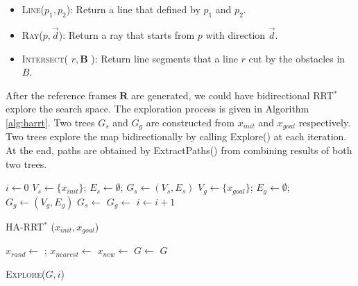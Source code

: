 \documentclass[letterpaper, 10 pt, conference]{ieeeconf}
\begin{document}
\begin{itemize}
	\item \textsc{Line}($ p_{1}, p_{2} $):
	Return a line that defined by $ p_{1} $ and $ p_{2} $.
	\item \textsc{Ray}($ p, \vec{d} $):
	Return a ray that starts from $ p $ with direction $ \vec{d}  $.
	\item \textsc{Intersect}( $ r , \bm{B} $ ):
	Return line segments that a line $ r $ cut by the obstacles in $ B $.
\end{itemize}

After the reference frames $ \mathbf{R} $ are generated, we could have bidirectional RRT$^{*}$ explore the search space.
The exploration process is given in Algorithm \ref{alg:harrt}.
Two trees $ G_{s} $ and $ G_{g} $ are constructed from $ x_{init} $ and $ x_{goal} $ respectively.
Two trees explore the map bidirectionally by calling {\sc Explore}() at each iteration.
At the end, paths are obtained by {\sc ExtractPaths}() from combining results of both two trees.

\begin{algorithm}
	\begin{algorithmic}[1]
		\State $ i \leftarrow 0 $
		\State $ V_{s} \leftarrow \{ x_{init} \} $; $ E_{s} \leftarrow \emptyset $; $ G_{s} \leftarrow (V_{s}, E_{s}) $
		\State $ V_{g} \leftarrow \{ x_{goal} \} $; $ E_{g} \leftarrow \emptyset $; $ G_{g} \leftarrow (V_{g}, E_{g}) $
			\State $ G_{s} \leftarrow $ 
			\State $ G_{g} \leftarrow $ 
			\State $ i \leftarrow i + 1 $
		\EndWhile
		\State {}
	\end{algorithmic}
	\caption{HA-RRT$^{*}$ ($ x_{init} , x_{goal}  $) }
	\label{alg:harrt}
\end{algorithm}

\begin{algorithm}
	\begin{algorithmic}[1]
		\State $ x_{rand} \leftarrow $  ;
		\State $ x_{nearest} \leftarrow $ 
		\State $ x_{new} \leftarrow $ 
			\State $ G \leftarrow $ 
		\EndIf
		\Return $ G $
	\end{algorithmic}
	\caption{ \textsc{Explore}($ G, i $) }
	\label{alg:harrt:explore}
\end{algorithm}
\end{document}
